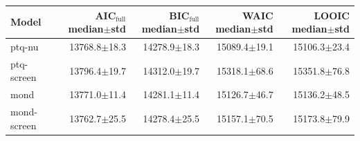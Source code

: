 \begin{tabular}{lrrrr}
\toprule
Model & AIC$_{\mathrm{full}}$ median$\pm$std & BIC$_{\mathrm{full}}$ median$\pm$std & WAIC median$\pm$std & LOOIC median$\pm$std \\
\midrule
ptq-nu & 13768.8$\pm$18.3 & 14278.9$\pm$18.3 & 15089.4$\pm$19.1 & 15106.3$\pm$23.4 \\
ptq-screen & 13796.4$\pm$19.7 & 14312.0$\pm$19.7 & 15318.1$\pm$68.6 & 15351.8$\pm$76.8 \\
mond & 13771.0$\pm$11.4 & 14281.1$\pm$11.4 & 15126.7$\pm$46.7 & 15136.2$\pm$48.5 \\
mond-screen & 13762.7$\pm$25.5 & 14278.4$\pm$25.5 & 15157.1$\pm$70.5 & 15173.8$\pm$79.9 \\
\bottomrule
\end{tabular}